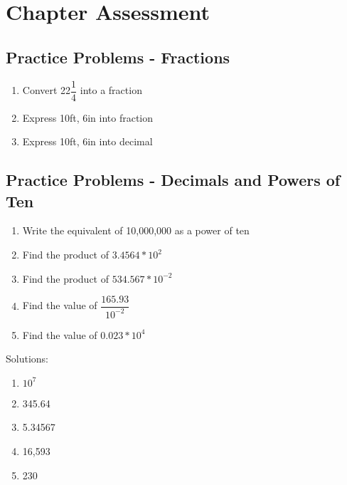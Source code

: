 
\chapter*{Chapter Assessment}
\section*{Practice Problems - Fractions}
\begin{enumerate}
\item Convert 22$\dfrac{1}{4}$ into a fraction
\item Express 10ft, 6in into fraction
\item Express 10ft, 6in into decimal
\end{enumerate}

\vspace{1cm}
\section*{Practice Problems - Decimals and Powers of Ten}
\begin{enumerate}
\item Write the equivalent of 10,000,000 as a power of ten
\item Find the product of $3.4564*10^2$
\item Find the product of $534.567*10^{-2}$
\vspace{0.2cm}
\item Find the value of $\dfrac{165.93}{10^{-2}}$
\vspace{0.2cm}
\item Find the value of $0.023*10^4$
\end{enumerate}
\vspace{1cm}
Solutions:\\
\begin{enumerate}
\item $10^7$
\item 345.64
\item 5.34567
\item 16,593
\item 230
\end{enumerate}
